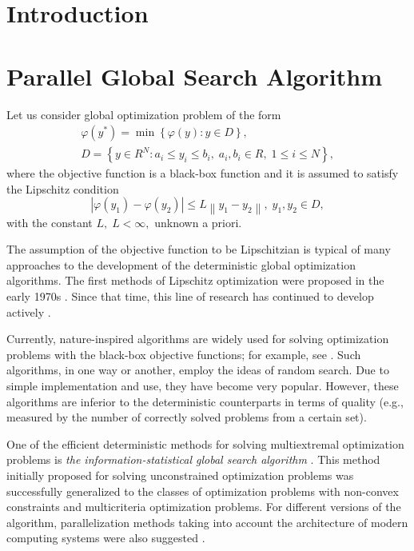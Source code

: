 \documentclass{svproc}
\begin{document}
\section{Introduction}



\section{Parallel Global Search Algorithm}\label{Sec_GSA}

Let us consider global optimization problem of the form 
\begin{gather}
 \varphi(y^\ast)=\min{\left\{\varphi(y):y\in D\right\}}, \label{problem}\\
 D=\left\{y\in R^N: a_i\leq y_i \leq b_i, \; a_i,b_i\in R, \;  1\leq i \leq N\right\} \label{D},
\end{gather}
where the objective function is a black-box function and it is assumed to satisfy the Lipschitz condition
\[
\left|\varphi(y_1)-\varphi(y_2)\right|\leq L\left\|y_1-y_2\right\|,\; y_1,y_2 \in D,
\]
with the constant $L, \; L<\infty,$ unknown a priori.

The assumption of the objective function to be Lipschitzian is typical of many approaches to the development of the deterministic global optimization algorithms.
The first methods of Lipschitz optimization were proposed in the early 1970s \cite{Piyavskii1972,Shubert1972}. Since that time, this line of research has continued to develop actively \cite{Evtushenko2013,Zilinskas2010,Pinter1996,Jones2009}.

Currently, nature-inspired algorithms are widely used for solving optimization problems with the black-box objective functions; for example, see \cite{Yang2013,Gendreau2010,Eiben2015}. Such algorithms, in one way or another, employ the ideas of random search. Due to simple implementation and use, they have become very popular. However, these algorithms are inferior to the deterministic counterparts in terms of quality \cite{Kvasov2018,Sergeyev2018} (e.g., measured by the number of correctly solved problems from a certain
set).


One of the efficient deterministic methods for solving multiextremal optimization problems is \textit{the information-statistical global search algorithm} \cite{Strongin2000}. This method initially proposed for solving unconstrained optimization problems was successfully generalized to the classes of optimization problems with non-convex constraints and multicriteria optimization problems. For different versions of the algorithm, parallelization methods taking into account the architecture of modern computing systems were also suggested \cite{Barkalov2016,globalizerSystem,Strongin2018}.%
\end{document}
